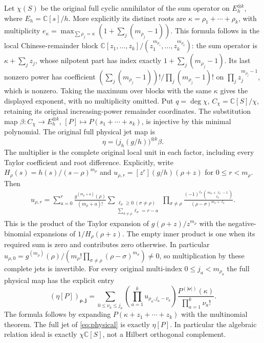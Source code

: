 \documentclass[11pt]{article}
\newcommand{\C}{\mathbb C}\newcommand{\R}{\mathbb R}
\begin{document}
Let $\chi(S)$ be the original full cyclic annihilator of
the sum operator on $E_h^{\otimes k}$, where
$E_h=\C[s]/h$. More explicitly its distinct roots are
$\kappa=\rho_1+\cdots+\rho_k$, with multiplicity
$e_\kappa=\max_{\sum\rho_j=\kappa}(1+\sum_j(m_{\rho_j}-1))$.
This formula follows in the local Chinese-remainder block
$\C[z_1,\ldots,z_k]/(z_1^{m_{\rho_1}},\ldots,z_k^{m_{\rho_k}})$:
the sum operator is $\kappa+\sum_jz_j$,
whose nilpotent part has index exactly
$1+\sum_j(m_{\rho_j}-1)$. Its last nonzero power has
coefficient
$(\sum_j(m_{\rho_j}-1))!/\prod_j(m_{\rho_j}-1)!$
on $\prod_jz_j^{m_{\rho_j}-1}$, which is nonzero.
Taking the maximum over blocks with the same $\kappa$
gives the displayed exponent, with no multiplicity omitted.
Put $q=\deg\chi$, $C_\chi=\C[S]/\chi$, retaining its
original increasing-power remainder coordinates.
The substitution map
$\beta:C_\chi\to E_h^{\otimes k}$,
$[P]\mapsto P(s_1+\cdots+s_k)$, is injective by this
minimal polynomial. The original full physical jet map is
\begin{equation}\label{eq:unitreceiver}
 \eta=\bigl(j_h(g/h)\bigr)^{\otimes k}\beta.
\end{equation}
The multiplier is the complete original local unit in
each factor, including every Taylor coefficient and
root difference. Explicitly, write $H_\rho(s)=h(s)/(s-\rho)^{m_\rho}$
and $u_{\rho,r}=[z^r](g/h)(\rho+z)$ for $0\leq r<m_\rho$.
Then
\begin{equation}\label{eq:unitcoefficients}
 \begin{split}
 u_{\rho,r}
 =\sum_{a=0}^r\frac{g^{(m_\rho+a)}(\rho)}{(m_\rho+a)!}
 \sum_{\substack{\ell_\sigma\geq0\ (\sigma\ne\rho)\\
                 \sum_{\sigma\ne\rho}\ell_\sigma=r-a}}
 \prod_{\sigma\ne\rho}
 \frac{(-1)^{\ell_\sigma}
       \binom{m_\sigma+\ell_\sigma-1}{\ell_\sigma}}
      {(\rho-\sigma)^{m_\sigma+\ell_\sigma}} .
 \end{split}
\end{equation}
This is the product of the Taylor expansion of
$g(\rho+z)/z^{m_\rho}$ with the negative-binomial
expansions of $1/H_\rho(\rho+z)$.
The empty inner product is one when its required sum is
zero and contributes zero otherwise.
In particular
$u_{\rho,0}=g^{(m_\rho)}(\rho)/
 (m_\rho!\prod_{\sigma\ne\rho}(\rho-\sigma)^{m_\sigma})\ne0$,
so multiplication by these complete jets is invertible.
For every original multi-index $0\leq j_a<m_{\rho_a}$ the
full physical map has the explicit entry
\begin{equation}\label{eq:etajets}
 (\eta[P])_{\boldsymbol\rho,\boldsymbol j}
 =\sum_{0\leq\nu_a\leq j_a}
     \left(\prod_{a=1}^k u_{\rho_a,j_a-\nu_a}\right)
          \frac{P^{(|\boldsymbol\nu|)}(\kappa)}
               {\prod_{a=1}^k\nu_a!}.
\end{equation}
The formula follows by expanding
$P(\kappa+z_1+\cdots+z_k)$ with the multinomial theorem.
The full jet of \eqref{eq:physical}
is exactly $\eta[P]$. In particular the algebraic
relation ideal is exactly $\chi\C[S]$, not a
Hilbert orthogonal complement.
\end{document}
